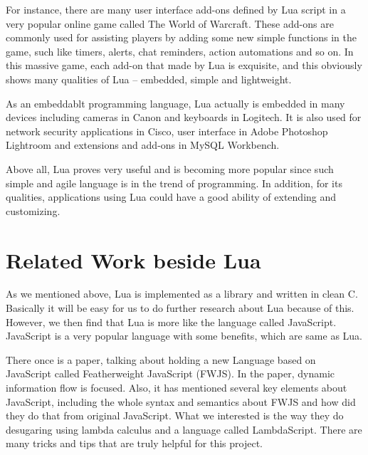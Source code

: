 For instance, there are many user interface add-ons defined by Lua script in a very popular online game called The World of Warcraft\cite{wowLua}. These add-ons are commonly used for assisting players by adding some new simple functions in the game, such like timers, alerts, chat reminders, action automations and so on. In this massive game, each add-on that made by Lua is exquisite, and this obviously shows many qualities of Lua -- embedded, simple and lightweight.

As an embeddablt programming language, Lua actually is embedded in many devices including cameras in Canon and keyboards in Logitech. It is also used for network security applications in Cisco\cite{CISCO}, user interface in Adobe Photoshop Lightroom and extensions and add-ons in MySQL Workbench.

Above all, Lua proves very useful and is becoming more popular since such simple and agile language is in the trend of programming. In addition, for its qualities, applications using Lua could have a good ability of extending and customizing.

\section{Related Work beside Lua}
As we mentioned above, Lua is implemented as a library and written in clean C. Basically it will be easy for us to do further research about Lua because of this. However, we then find that Lua is more like the language called JavaScript. JavaScript is a very popular language with some benefits, which are same as Lua.

There once is a paper, talking about holding a new Language based on JavaScript called Featherweight JavaScript (FWJS)\cite{FWJS}. In the paper, dynamic information flow is focused. Also, it has mentioned several key elements about JavaScript, including the whole syntax and semantics about FWJS and how did they do that from original JavaScript. What we interested is the way they do desugaring using lambda calculus and a language called LambdaScript. There are many tricks and tips that are truly helpful for this project.